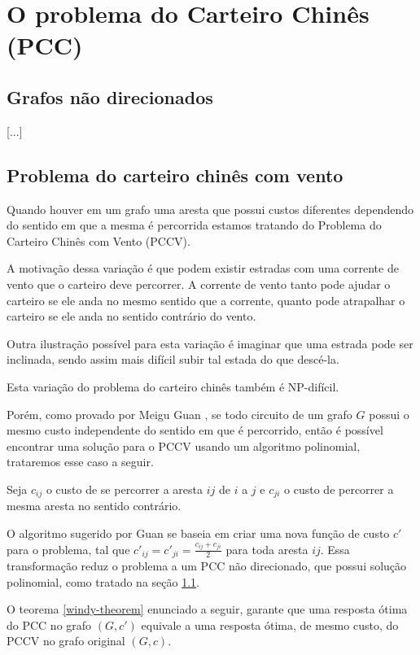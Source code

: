 \section{O problema do Carteiro Chinês (PCC)}


\subsection{Grafos não direcionados}
        \label{sec:pcc}
        [...]

    \subsection{Problema do carteiro chinês com vento}

        Quando houver em um grafo uma aresta que possui custos diferentes dependendo do sentido em que a mesma é percorrida estamos tratando do Problema do Carteiro Chinês com Vento (PCCV).

        A motivação dessa variação é que podem existir estradas com uma corrente de vento que o carteiro deve percorrer. 
        A corrente de vento tanto pode ajudar o carteiro se ele anda no mesmo sentido que a corrente, quanto pode atrapalhar o carteiro se ele anda no sentido contrário do vento.

        Outra ilustração possível para esta variação é imaginar que uma estrada pode ser inclinada, sendo assim mais difícil subir tal estada do que descé-la.

        Esta variação do problema do carteiro chinês também é NP-difícil.

        Porém, como provado por Meigu Guan \cite{guan-windy}, se todo circuito de um grafo $G$ possui o mesmo custo independente do sentido em que é percorrido, então é possível encontrar uma solução para o PCCV usando um algoritmo polinomial, trataremos esse caso a seguir.

        Seja $c_{ij}$ o custo de se percorrer a aresta $ij$ de $i$ a $j$ e $c_{ji}$ o custo de percorrer a mesma aresta no sentido contrário.

        O algoritmo sugerido por Guan se baseia em criar uma nova função de custo $c'$ para o problema, tal que $c'_{ij} = c'_{ji} = \frac{c_{ij} + c_{ji}}{2}$ para toda aresta $ij$. 
        Essa transformação reduz o problema a um PCC não direcionado, que possui solução polinomial, como tratado na seção \ref{sec:pcc}.

        O teorema \ref{windy-theorem} enunciado a seguir, garante que uma resposta ótima do PCC no grafo $(G, c')$ equivale a uma resposta ótima, de mesmo custo, do PCCV no grafo original $(G, c)$.

